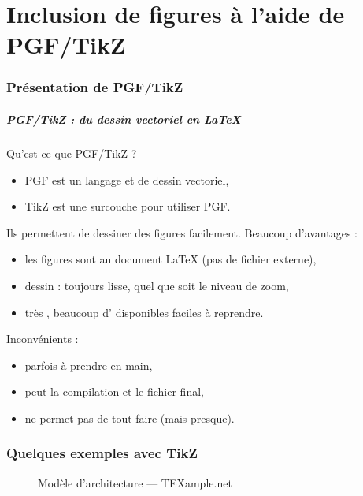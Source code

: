 
\part{Inclusion de figures à l'aide de PGF/TikZ}

\section{Présentation de PGF/TikZ}

\begin{frame}
  \frametitle{PGF/TikZ : du dessin vectoriel en \LaTeX}

Qu'est-ce que PGF/TikZ ?
\begin{itemize}
  \item PGF est un langage  et  de dessin vectoriel,
  \item TikZ est une surcouche  pour utiliser PGF.
\end{itemize}

\bigskip
Ils permettent de dessiner des figures facilement. Beaucoup d'avantages :
\begin{itemize}
  \item les figures sont  au document \LaTeX{} (pas de fichier externe),
  \item dessin  : toujours lisse, quel que soit le niveau de zoom,
  \item très , beaucoup d' disponibles faciles à reprendre.
\end{itemize}

\bigskip
Inconvénients :
\begin{itemize}
  \item parfois  à prendre en main,
  \item peut  la compilation et le fichier final,
  \item ne permet pas de tout faire (mais presque).
\end{itemize}
\end{frame}



\section{Quelques exemples avec TikZ}

\begin{frame}
  \begin{figure}
    \centering
    \tikzexa
    \caption{\footnotesize Modèle d'architecture --- TEXample.net \cite{tikzandpgfexamples}}
  \end{figure}
\end{frame}

